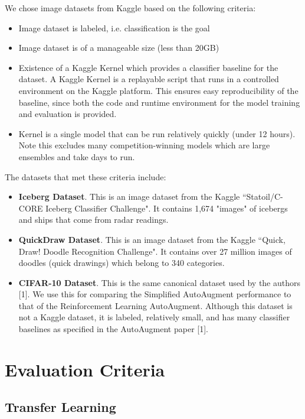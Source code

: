\documentclass[10pt,twocolumn,letterpaper]{article}
\begin{document}
We chose image datasets from Kaggle based on the following criteria:

\begin{itemize}
  \item Image dataset is labeled, i.e. classification is the goal
  \item Image dataset is of a manageable size (less than 20GB)
  \item Existence of a Kaggle Kernel which provides a classifier baseline for the dataset.  A Kaggle Kernel is a replayable script that runs in a controlled environment on the Kaggle platform.  This ensures easy reproducibility of the baseline, since both the code and runtime environment for the model training and evaluation is provided.
  \item Kernel is a single model that can be run relatively quickly (under 12 hours).  Note this excludes many competition-winning models which are large ensembles and take days to run.
\end{itemize}

The datasets that met these criteria include:

\begin{itemize}
  \item \textbf{Iceberg Dataset}.  This is an image dataset from the Kaggle “Statoil/C-CORE Iceberg Classifier Challenge".  It contains 1,674 "images" of icebergs and ships that come from radar readings.  
  \item \textbf{QuickDraw Dataset}.  This is an image dataset from the Kaggle “Quick, Draw! Doodle Recognition Challenge".  It contains over 27 million images of doodles (quick drawings) which belong to 340 categories.  
  \item \textbf{CIFAR-10 Dataset}.  This is the same canonical dataset used by the authors [1].  We use this for comparing the Simplified AutoAugment performance to that of the Reinforcement Learning AutoAugment.  Although this dataset is not a Kaggle dataset, it is labeled, relatively small, and has many classifier baselines as specified in the AutoAugment paper [1].        
\end{itemize}


\section{Evaluation Criteria}

\subsection{Transfer Learning}
\end{document}
